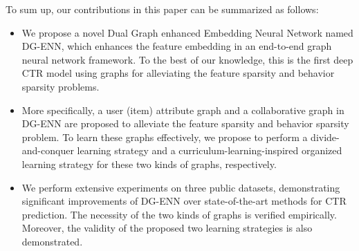 To sum up, our contributions in this paper can be summarized as follows: 
\begin{itemize}
	\item We propose a novel Dual Graph enhanced Embedding Neural Network named DG-ENN, which enhances the feature embedding in an end-to-end graph neural network framework. To the best of our knowledge, this is the first deep CTR model using graphs for alleviating the feature sparsity and behavior sparsity problems. 
	


	\item More specifically, a user (item) attribute graph and a collaborative graph in DG-ENN are proposed to alleviate the feature sparsity and behavior sparsity problem. To learn these graphs effectively, we propose to perform a divide-and-conquer learning strategy and a curriculum-learning-inspired organized learning strategy for these two kinds of graphs, respectively.
	

	
	\item We perform extensive experiments on three public datasets, demonstrating significant improvements of DG-ENN over state-of-the-art methods for CTR prediction. The necessity of the two kinds of graphs is verified empirically. Moreover, the validity of the proposed two learning strategies is also demonstrated.
\end{itemize} 
